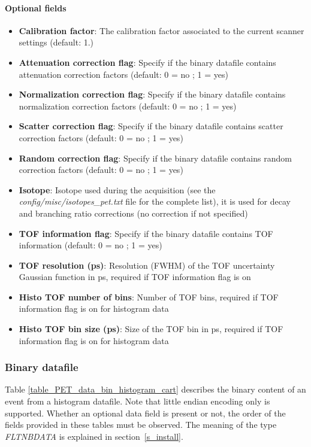 \documentclass[a4paper, 11pt]{article}
\begin{document}
\paragraph{Optional fields}
\begin{itemize}
  \item \textbf{Calibration factor}: The calibration factor associated to the current scanner settings (default: 1.)
  \item \textbf{Attenuation correction flag}: Specify if the binary datafile contains attenuation correction factors (default: 0 = no ; 1 = yes)
  \item \textbf{Normalization correction flag}: Specify if the binary datafile contains normalization correction factors (default: 0 = no ; 1 = yes)
  \item \textbf{Scatter correction flag}: Specify if the binary datafile contains scatter correction factors (default: 0 = no ; 1 = yes)
  \item \textbf{Random correction flag}: Specify if the binary datafile contains random correction factors (default: 0 = no ; 1 = yes)
  \item \textbf{Isotope}: Isotope used during the acquisition (see the \textit{config/misc/isotopes\_pet.txt} file for the complete list),
                          it is used for decay and branching ratio corrections (no correction if not specified)
  \item \textbf{TOF information flag}: Specify if the binary datafile contains TOF information (default: 0 = no ; 1 = yes)
  \item \textbf{TOF resolution (ps)}: Resolution (FWHM) of the TOF uncertainty Gaussian function in ps, required if TOF information flag is on
  \item \textbf{Histo TOF number of bins}: Number of TOF bins, required if TOF information flag is on for histogram data
  \item \textbf{Histo TOF bin size (ps)}: Size of the TOF bin in ps, required if TOF information flag is on for histogram data
\end{itemize}

\subsubsection{Binary datafile}

Table \ref{table_PET_data_bin_histogram_cart} describes the binary content of an event from a histogram datafile.
Note that little endian encoding only is supported. Whether an optional data field is present or not, the order of the fields provided in these tables
must be observed. The meaning of the type \textit{FLTNBDATA} is explained in section~\ref{s_install}.
\end{document}
